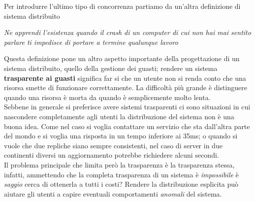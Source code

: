 Per introdurre l'ultimo tipo di concorrenza partiamo da un'altra definizione di sistema distribuito
\begin{center}
\emph{Ne apprendi l'esistenza quando il crash di un computer di cui non hai mai sentito parlare ti impedisce di portare a termine qualunque lavoro}
\end{center}
Questa definizione pone un altro aspetto importante della progettazione di un sistema distribuito, quello della gestione dei guasti; rendere un sistema \textbf{trasparente ai guasti} significa far si che un utente non si renda conto che una risorsa smette di funzionare correttamente. La difficoltà più grande è distinguere quando una risorsa è morta da quando è semplicemente molto lenta.\\
Sebbene in generale si preferisce avere sistemi trasparenti ci sono situazioni in cui nascondere completamente agli utenti la distribuzione del sistema non è una buona idea. Come nel caso si voglia contattare un servizio che sta dall'altra parte del mondo e si voglia una risposta in un tempo inferiore ai 35ms; o quando si vuole che due repliche siano sempre consistenti, nel caso di server in due continenti diversi un aggiornamento potrebbe richiedere alcuni secondi.\\
Il problema principale che limita però la trasparenza è la trasparenza stessa, infatti, ammettendo che la completa trasparenza di un sistema è \emph{impossibile} è \emph{saggio} cerca di ottenerla a tutti i costi? Rendere la distribuzione esplicita può aiutare gli utenti a capire eventuali comportamenti \emph{anomali} del sistema.
